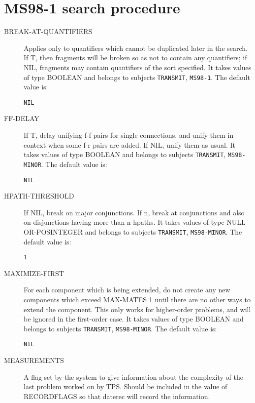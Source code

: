 \section{MS98-1 search procedure}

\begin{description} 
\item[BREAK-AT-QUANTIFIERS]  
Applies only to quantifiers which cannot be duplicated 
later in the search. If T, then fragments will be broken so as 
not to contain any quantifiers; if NIL, fragments may contain
quantifiers of the sort specified.
It takes values of type BOOLEAN and belongs to subjects \texttt{TRANSMIT}, \texttt{MS98-1}.  The default value is: \begin{lstlisting}
NIL
\end{lstlisting}

\item[FF-DELAY]  
If T, delay unifying f-f pairs for single connections, and unify
them in context when some f-r pairs are added. If NIL, unify them as usual.
It takes values of type BOOLEAN and belongs to subjects \texttt{TRANSMIT}, \texttt{MS98-MINOR}.  The default value is: \begin{lstlisting}
NIL
\end{lstlisting}

\item[HPATH-THRESHOLD]  
If NIL, break on major conjunctions. If n, break at
conjunctions and also on disjunctions having more than n hpaths.
It takes values of type NULL-OR-POSINTEGER and belongs to subjects \texttt{TRANSMIT}, \texttt{MS98-MINOR}.  The default value is: \begin{lstlisting}
1
\end{lstlisting}

\item[MAXIMIZE-FIRST]  
For each component which is being extended, do not create 
any new components which exceed MAX-MATES 1 until there are no other
ways to extend the component. This only works for higher-order
problems, and will be ignored in the first-order case.
It takes values of type BOOLEAN and belongs to subjects \texttt{TRANSMIT}, \texttt{MS98-MINOR}.  The default value is: \begin{lstlisting}
NIL
\end{lstlisting}

\item[MEASUREMENTS]  
A flag set by the system to give information about
the complexity of the last problem worked on by TPS.
Should be included in the value of RECORDFLAGS
so that daterec will record the information.


\end{description}
